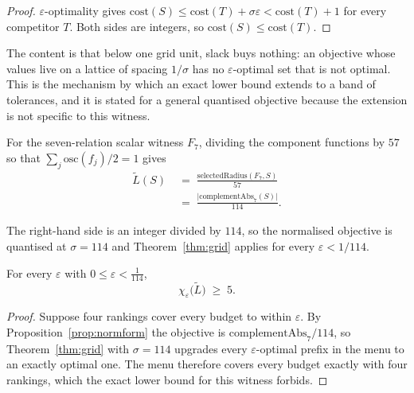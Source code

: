 \begin{proof}
$\varepsilon$-optimality gives $\mathrm{cost}(S)\le\mathrm{cost}(T)+\sigma\varepsilon
<\mathrm{cost}(T)+1$ for every competitor $T$. Both sides are integers, so
$\mathrm{cost}(S)\le\mathrm{cost}(T)$.
\end{proof}


The content is that below one grid unit, slack buys nothing: an objective whose values live
on a lattice of spacing $1/\sigma$ has no $\varepsilon$-optimal set that is not optimal. This
is the mechanism by which an exact lower bound extends to a band of tolerances, and it is
stated for a general quantised objective because the extension is not specific to this
witness.

\begin{proposition}
\label{prop:normform}
For the seven-relation scalar witness $F_{7}$, dividing the component functions by $57$ so
that $\sum_{j}\mathrm{osc}(f_{j})/2=1$ gives
\begin{equation}
\begin{aligned}
\widetilde{L}(S)
&\;=\;\frac{\mathrm{selectedRadius}(F_{7},S)}{57}\\
&\;=\;\frac{\bigl|\mathrm{complementAbs}_{7}(S)\bigr|}{114}.
\end{aligned}
\label{eq:normform}
\end{equation}
\end{proposition}


The right-hand side is an integer divided by $114$, so the normalised objective is quantised
at $\sigma=114$ and Theorem~\ref{thm:grid} applies for every $\varepsilon<1/114$.

\begin{theorem}
\label{thm:fiveband}
For every $\varepsilon$ with $0\le\varepsilon<\tfrac{1}{114}$,
\begin{equation}
\chi_{\varepsilon}\bigl(\widetilde{L}\bigr)\;\geq\;5 .
\label{eq:fiveband}
\end{equation}
\end{theorem}

\begin{proof}
Suppose four rankings cover every budget to within $\varepsilon$. By
Proposition~\ref{prop:normform} the objective is $\mathrm{complementAbs}_{7}/114$, so
Theorem~\ref{thm:grid} with $\sigma=114$ upgrades every $\varepsilon$-optimal prefix in the
menu to an exactly optimal one. The menu therefore covers every budget exactly with four
rankings, which the exact lower bound for this witness forbids.
\end{proof}

